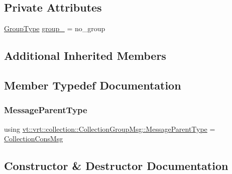\subsection*{Private Attributes}
\begin{DoxyCompactItemize}
\item 
\hyperlink{namespacevt_a27b5e4411c9b6140c49100e050e2f743}{Group\+Type} \hyperlink{structvt_1_1vrt_1_1collection_1_1_collection_group_msg_a239d07dbff6442f841aafe126af98dce}{group\+\_\+} = no\+\_\+group
\end{DoxyCompactItemize}
\subsection*{Additional Inherited Members}


\subsection{Member Typedef Documentation}
\mbox{\label{structvt_1_1vrt_1_1collection_1_1_collection_group_msg_a4468c3f74ebd21257bfbb35222ac1fa4}} 
\subsubsection{\texorpdfstring{Message\+Parent\+Type}{MessageParentType}}
{\footnotesize\ttfamily using \hyperlink{structvt_1_1vrt_1_1collection_1_1_collection_group_msg_a4468c3f74ebd21257bfbb35222ac1fa4}{vt\+::vrt\+::collection\+::\+Collection\+Group\+Msg\+::\+Message\+Parent\+Type} =  \hyperlink{structvt_1_1vrt_1_1collection_1_1_collection_cons_msg}{Collection\+Cons\+Msg}}



\subsection{Constructor \& Destructor Documentation}
\mbox{\label{structvt_1_1vrt_1_1collection_1_1_collection_group_msg_a3b5c4da131f779c814ede149ec3fbb81}} 
